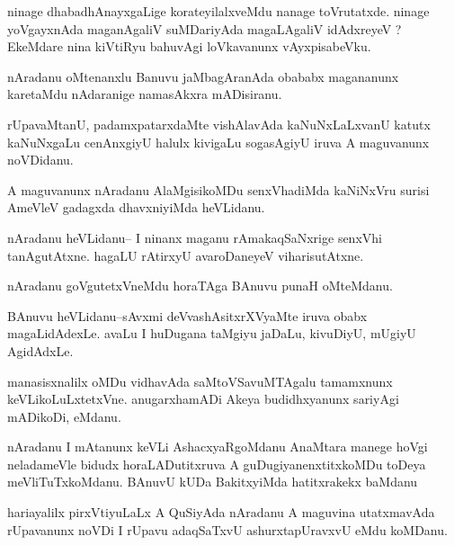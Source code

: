 \documentclass{article}
\begin{document}
\begin{mn}%
ninage dhabadhAnayxgaLige korateyilalxveMdu nanage toVrutatxde. ninage yoVgayxnAda 
maganAgaliV suMDariyAda magaLAgaliV idAdxreyeV ? EkeMdare nina kiVtiRyu bahuvAgi 
loVkavanunx vAyxpisabeVku.
\end{mn}

\begin{mn}%
nAradanu oMtenanxlu Banuvu jaMbagAranAda obababx magananunx karetaMdu nAdaranige 
namasAkxra mADisiranu.
\end{mn}

\begin{mn}%
rUpavaMtanU, padamxpatarxdaMte vishAlavAda kaNuNxLaLxvanU katutx kaNuNxgaLu cenAnxgiyU 
halulx kivigaLu sogasAgiyU iruva A maguvanunx noVDidanu.
\end{mn}

\begin{mn}%
A maguvanunx nAradanu AlaMgisikoMDu senxVhadiMda kaNiNxVru surisi AmeVleV gadagxda 
dhavxniyiMda heVLidanu.
\end{mn}

\begin{mn}%
nAradanu heVLidanu-- I ninanx maganu rAmakaqSaNxrige senxVhi tanAgutAtxne. hagaLU rAtirxyU 
avaroDaneyeV viharisutAtxne.
\end{mn}

\begin{mn}%
nAradanu goVgutetxVneMdu horaTAga BAnuvu punaH oMteMdanu.
\end{mn}

\begin{mn}%
BAnuvu heVLidanu--sAvxmi deVvashAsitxrXVyaMte iruva obabx magaLidAdexLe. avaLu I huDugana 
taMgiyu jaDaLu, kivuDiyU, mUgiyU AgidAdxLe.
\end{mn}

\begin{mn}%
manasisxnalilx oMDu vidhavAda saMtoVSavuMTAgalu tamamxnunx keVLikoLuLxtetxVne. 
anugarxhamADi Akeya budidhxyanunx sariyAgi mADikoDi, eMdanu.
\end{mn}

\begin{mn}%
nAradanu I mAtanunx keVLi AshacxyaRgoMdanu AnaMtara manege hoVgi neladameVle bidudx 
horaLADutitxruva A guDugiyanenxtitxkoMDu toDeya meVliTuTxkoMdanu. BAnuvU kUDa BakitxyiMda 
hatitxrakekx baMdanu
\end{mn}

\begin{mn}%
hariayalilx pirxVtiyuLaLx A QuSiyAda nAradanu A maguvina utatxmavAda rUpavanunx noVDi I 
rUpavu adaqSaTxvU ashurxtapUravxvU eMdu koMDanu.
\end{mn}
\end{document}
